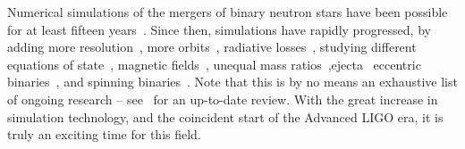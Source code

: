 Numerical simulations of the mergers of binary neutron stars have been possible for at least fifteen years~\citep{Shibata00b}. Since then, simulations have rapidly progressed, by adding more resolution~\citep{Hotokezaka2013}, more orbits~\citep{Haas:2016}, radiative losses~\citep{Kiuchi:2012mk,Neilsen:2014hha,Palenzuela2015,Sekiguchi:2015}, studying different equations of state~\citep{Hotokezaka:2011dh,Kiuchi:2012mk,Neilsen:2014hha}, magnetic fields~\citep{Liu:2008xy,Giacomazzo:2010bx,Rezzolla:2011da,Anderson:2008zp,Neilsen:2014hha,Kiuchi2015,PalenzuelaEtAl:2013,Palenzuela:2013kra,2015arXiv150202021D}, unequal mass ratios~\citep{Rezzolla:2010fd,Kiuchi:2010ze,Shibata:2003ga,Dietrich:2015iva},ejecta~\citep{Wanajo2014,Sekiguchi:2015,RadiceLeak:2016} eccentric binaries~\citep{Gold:2011df}, and spinning binaries~\cite{Bernuzzi:2013rza,Kastaun:2013mv,Dietrich:2015pxa,Tacik:2015tja}. Note that this is by no means an exhaustive list of ongoing research -- see~\cite{Baiotti:2016qnr} for an up-to-date review. With the great increase in simulation technology, and the coincident start of the Advanced LIGO era, it is truly an exciting time for this field.




